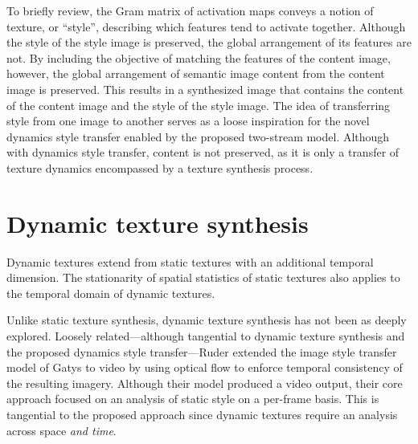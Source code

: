 To briefly review, the Gram matrix of activation maps conveys a notion of texture, or ``style'', describing which features tend to activate together. Although the style of the style image is preserved, the global arrangement of its features are not. By including the objective of matching the features of the content image, however, the global arrangement of semantic image content from the content image is preserved. This results in a synthesized image that contains the content of the content image and the style of the style image. The idea of transferring style from one image to another serves as a loose inspiration for the novel dynamics style transfer enabled by the proposed two-stream model. Although with dynamics style transfer, content is not preserved, as it is only a transfer of texture dynamics encompassed by a texture synthesis process.

\section{Dynamic texture synthesis}

Dynamic textures extend from static textures with an additional temporal dimension. The stationarity of spatial statistics of static textures also applies to the temporal domain of dynamic textures.

Unlike static texture synthesis, dynamic texture synthesis has not been as deeply explored. Loosely related---although tangential to dynamic texture synthesis and the proposed dynamics style transfer---Ruder \etal \cite{ruder2016} extended the image style transfer model of Gatys \etal \cite{gatys2016image} to video by using 
optical flow to enforce temporal consistency of the
resulting imagery. Although their model produced a video output, their core approach focused on an analysis of static style on a per-frame basis. This is tangential to the proposed approach since dynamic textures require an analysis across space \emph{and time}.

